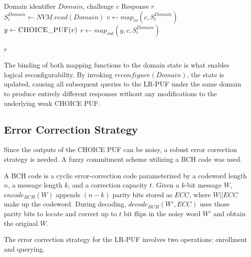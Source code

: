 \begin{algorithm}[ht!]
\caption{$query(c,Domain)$}
\begin{algorithmic}[1]
    \Require Domain identifier $Domain$, challenge $c$
    \Ensure  Response $r$ 
    \State $S_i^{Domain} \leftarrow NVM.read(Domain)$
    \State $v \leftarrow map_{in}(c, S_i^{Domain})$
    \State $y \leftarrow \textsc{CHOICE\_PUF}(v)$
    \State $r \leftarrow map_{out}(y,c, S_i^{Domain})$
    
    \State \Return $r$
\end{algorithmic}
\label{alg:LRPUF-query}
\end{algorithm}

The binding of both mapping functions to the domain state is what enables logical reconfigurability. By invoking $reconfigure(Domain)$, the state is updated, causing all subsequent queries to the LR-PUF under the same domain to produce entirely different responses without any modifications to the underlying weak CHOICE PUF. 

\subsection{Error Correction Strategy}

Since the outputs of the CHOICE PUF can be noisy, a robust error correction strategy is needed. A fuzzy commitment scheme utilizing a BCH code \cite{BOSE196068} was used.

A BCH code is a cyclic error-correction code parameterized by a codeword length $n$, a message length $k$, and a correction capacity $t$. Given a $k$-bit message $W$, $encode_{BCH}(W)$ appends $(n - k)$ parity bits stored as $ECC$, where $W||ECC$ make up the codeword. During decoding, $decode_{BCH}(W', ECC)$ uses those parity bits to locate and correct up to $t$ bit flips in the noisy word $W'$ and obtain the original $W$.



The error correction strategy for the LR-PUF involves two operations: enrollment and querying. 
